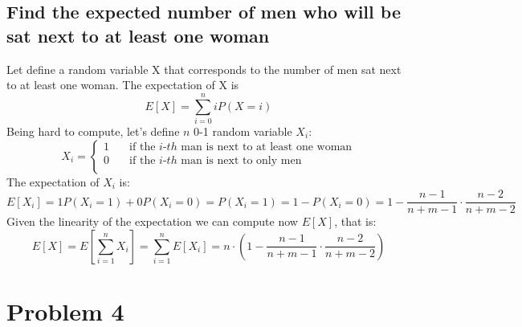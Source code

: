 \documentclass[oneside]{article}			%
\begin{document}
	\subsection{Find the expected number of men who will be sat next to at least one woman}
	Let define a random variable X that corresponds to the number of men sat next to at least one woman. The expectation of X is
	\[ E[X] =  \sum_{i=0}^{n}iP(X=i)\]
	Being hard to compute, let's define $n$ 0-1 random variable $X_i$:
	\[ X_i = \begin{cases}
		1 & \quad \text{if the } i \text{-$th$ man is next to at least one woman} \\
		0 & \quad \text{if the } i \text{-$th$ man is next to only men} \\
		 \end{cases}\]
	The expectation of $X_i$ is:
	\[ E[X_i] =  1P(X_i=1)+0P(X_i=0) = P(X_i=1) = 1-P(X_i=0) = 1 - \frac{n-1}{n+m-1}\cdot\frac{n-2}{n+m-2}\]
	Given the linearity of the expectation we can compute now $E[X]$, that is:
	\[ E[X] =  E[\sum_{i=1}^{n}X_i] = \sum_{i=1}^{n}E[X_i] = n\cdot(1 - \frac{n-1}{n+m-1}\cdot\frac{n-2}{n+m-2}) \]



		
		
	\clearpage				%
	\setcounter{section}{4}		%
	\setcounter{subsection}{0}		%
	\section*{Problem 4} 
\end{document}
